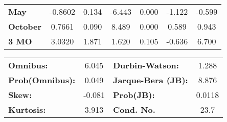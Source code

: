 \begin{center}
\begin{tabular}{lcccccc}
\textbf{May}      &      -0.8602  &        0.134     &    -6.443  &         0.000        &       -1.122    &       -0.599     \\
\textbf{October}  &       0.7661  &        0.090     &     8.489  &         0.000        &        0.589    &        0.943     \\
\textbf{3 MO}     &       3.0320  &        1.871     &     1.620  &         0.105        &       -0.636    &        6.700     \\
\bottomrule
\end{tabular}
\begin{tabular}{lclc}
\textbf{Omnibus:}       &  6.045 & \textbf{  Durbin-Watson:     } &    1.288  \\
\textbf{Prob(Omnibus):} &  0.049 & \textbf{  Jarque-Bera (JB):  } &    8.876  \\
\textbf{Skew:}          & -0.081 & \textbf{  Prob(JB):          } &   0.0118  \\
\textbf{Kurtosis:}      &  3.913 & \textbf{  Cond. No.          } &     23.7  \\
\bottomrule
\end{tabular}
\end{center}

